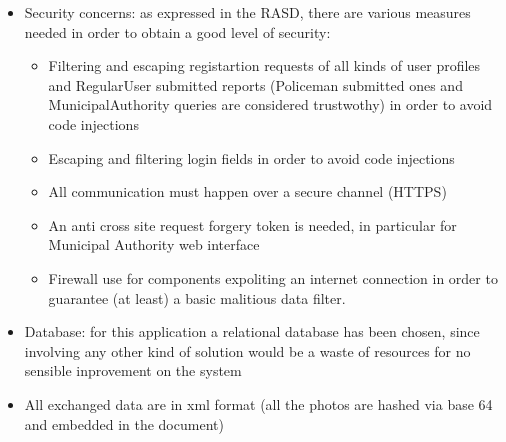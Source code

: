 \begin{itemize}
	\item Security concerns: as expressed in the RASD, there are various measures needed in order to obtain a good level of security:
	\begin{itemize}
		\item Filtering and escaping registartion requests of all kinds of user profiles and RegularUser submitted reports (Policeman submitted ones and MunicipalAuthority queries are considered trustwothy) in order to avoid code injections
		\item Escaping and filtering login fields in order to avoid code injections
		\item All communication must happen over a secure channel (HTTPS)
		\item An anti cross site request forgery token is needed, in particular for Municipal Authority web interface
		\item Firewall use for components expoliting an internet connection in order to guarantee (at least) a basic malitious data filter.
	\end{itemize}
	
	\item Database: for this application a relational database has been chosen, since involving any other kind of solution would be a waste of resources for no sensible inprovement on the system
	
	\item All exchanged data are in xml format (all the photos are hashed via base 64 and embedded in the document)
\end{itemize}